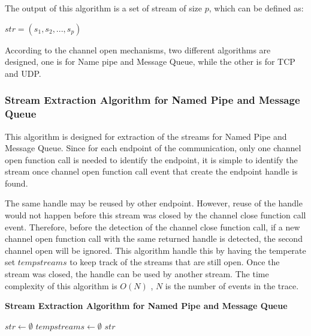 The output of this algorithm is a set of stream of size $p$, which can be defined as:

$str = (s_1, s_2, ..., s_p)$

According to the channel open mechanisms, two different algorithms are designed, one is for Name pipe and Message Queue, while the other is for TCP and UDP. 

\subsubsection{Stream Extraction Algorithm for Named Pipe and Message Queue}
This algorithm is designed for extraction of the streams for Named Pipe and Message Queue. Since for each endpoint of the communication, only one channel open function call is needed to identify the endpoint, it is simple to identify the stream once channel open function call event that create the endpoint handle is found. 

The same handle may be reused by other endpoint. However, reuse of the handle would not happen before this stream was closed by the channel close function call event. Therefore, before the detection of the channel close function call, if a new channel open function call with the same returned handle is detected, the second channel open will be ignored. This algorithm handle this by having the temperate set $tempstreams$ to keep track of the streams that are still open. Once the stream was closed, the handle can be used by another stream. The time complexity of this algorithm is $O(N)$ , $N$ is the number of events in the trace.

\begin{algorithm}[H]
\DontPrintSemicolon
\caption{{\bf Stream Extraction Algorithm for Named Pipe and Message Queue} \label{streamext1}}
$str \leftarrow \emptyset$\; 
$tempstreams \leftarrow \emptyset$\;
\KwRet $str$\;
\end{algorithm} 

